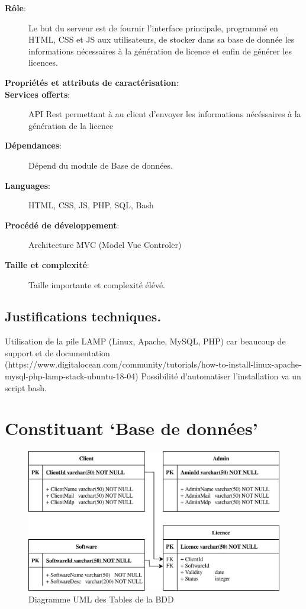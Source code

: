 \begin{description}
	\item[\textbf{Rôle}:]
				Le but du serveur est de fournir l'interface principale, programmé 
				en HTML, CSS et JS aux utilisateurs, de stocker dans sa base de donnée
				les informations nécessaires à la génération de licence et enfin de générer 
				les licences.
	\item[\textbf{Propriétés et attributs de caractérisation}:]
	\item[\textbf{Services offerts}:]
				API Rest permettant à au client d'envoyer les informations
				nécéssaires à la génération de la licence 
	\item[\textbf{Dépendances}:]
				Dépend du module de Base de données.
	\item[\textbf{Languages}:]
				HTML, CSS, JS, PHP, SQL, Bash 
	\item[\textbf{Procédé de développement}:]
				Architecture MVC (Model Vue Controler)
	\item[\textbf{Taille et complexité}:]
				Taille importante et complexité élévé.
\end{description}

\subsection{Justifications techniques.}
Utilisation de la pile LAMP (Linux, Apache, MySQL, PHP) car beaucoup de 
support et de documentation (https://www.digitalocean.com/community/tutorials/how-to-install-linux-apache-mysql-php-lamp-stack-ubuntu-18-04)\newline
Possibilité d'automatiser l'installation va un script bash.

\newpage
\section{Constituant `Base de données'}

\begin{figure}[h]
	\centering
	\includegraphics[width=\textwidth]{../png/SQL_table.png}
	\caption{Diagramme UML des Tables de la BDD}
	\label{fig:fig2}
\end{figure}

